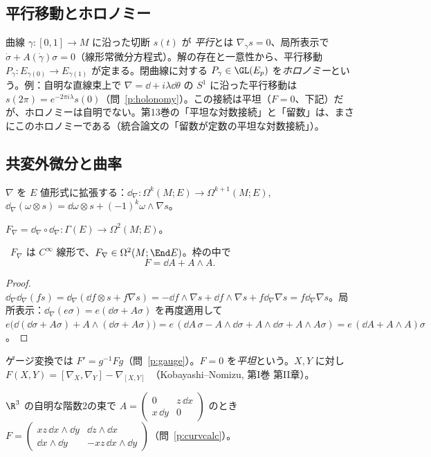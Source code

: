 \subsection{平行移動とホロノミー}
曲線 $\gamma:[0,1]\to M$ に沿った切断 $s(t)$ が \emph{平行}とは $\nabla_{\dot\gamma}s=0$、局所表示で $\dot\sigma+A(\dot\gamma)\sigma=0$（線形常微分方程式）。解の存在と一意性から、平行移動 $P_\gamma:E_{\gamma(0)}\to E_{\gamma(1)}$ が定まる。閉曲線に対する $P_\gamma\in\GL(E_p)$ を\emph{ホロノミー}という。例：自明な直線束上で $\nabla=\dd+i\lambda\dd\theta$ の $S^1$ に沿った平行移動は $s(2\pi)=e^{-2\pi i\lambda}s(0)$（問~\ref{p:holonomy}）。この接続は平坦（$F=0$、下記）だが、ホロノミーは自明でない。第13巻の「平坦な対数接続」と「留数」は、まさにこのホロノミーである（統合論文の「留数が定数の平坦な対数接続」）。

\subsection{共変外微分と曲率}
$\nabla$ を $E$ 値形式に拡張する：$\dd_\nabla:\Omega^k(M;E)\to\Omega^{k+1}(M;E)$, $\dd_\nabla(\omega\otimes s)=\dd\omega\otimes s+(-1)^k\omega\wedge\nabla s$。

\begin{defn}[曲率]
$F_\nabla=\dd_\nabla\circ\dd_\nabla:\Gamma(E)\to\Omega^2(M;E)$。
\end{defn}
\begin{prop}\label{prop:curv}\tP\
$F_\nabla$ は $C^\infty$ 線形で、$F_\nabla\in\Omega^2(M;\End E)$。枠の中で
\[
F=\dd A+A\wedge A.
\]
\end{prop}
\begin{proof}
$\dd_\nabla\dd_\nabla(fs)=\dd_\nabla(\dd f\otimes s+f\nabla s)=-\dd f\wedge\nabla s+\dd f\wedge\nabla s+f\dd_\nabla\nabla s=f\dd_\nabla\nabla s$。局所表示：$\dd_\nabla(e\sigma)=e(\dd\sigma+A\sigma)$ を再度適用して $e\bigl(\dd(\dd\sigma+A\sigma)+A\wedge(\dd\sigma+A\sigma)\bigr)=e\,(\dd A\,\sigma-A\wedge\dd\sigma+A\wedge\dd\sigma+A\wedge A\sigma)=e\,(\dd A+A\wedge A)\sigma$。
\end{proof}

ゲージ変換では $F'=g^{-1}Fg$（問~\ref{p:gauge}）。$F=0$ を\emph{平坦}という。$X,Y$ に対し $F(X,Y)=[\nabla_X,\nabla_Y]-\nabla_{[X,Y]}$\tC\ （Kobayashi--Nomizu, 第I巻 第II章）。

\begin{ex}\label{ex:curvcalc}
$\R^3$ の自明な階数2の束で $A=\begin{pmatrix}0&z\,\dd x\\x\,\dd y&0\end{pmatrix}$ のとき
$F=\begin{pmatrix}xz\,\dd x\wedge\dd y&\dd z\wedge\dd x\\\dd x\wedge\dd y&-xz\,\dd x\wedge\dd y\end{pmatrix}$（問~\ref{p:curvcalc}）。
\end{ex}

